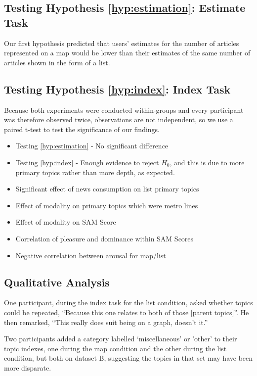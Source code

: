 \subsection{Testing Hypothesis \ref{hyp:estimation}: Estimate Task}

Our first hypothesis predicted that users' estimates for the number of articles represented on a map would be lower than their estimates of the same number of articles shown in the form of a list.


\subsection{Testing Hypothesis \ref{hyp:index}: Index Task}

Because both experiments were conducted within-groups and every participant was therefore observed twice, observations are not independent, so we use a paired t-test to test the significance of our findings.

\begin{itemize}
	\item Testing \ref{hyp:estimation} - No significant difference
	\item Testing \ref{hyp:index} - Enough evidence to reject $H_0$, and this is due to more primary topics rather than more depth, as expected.
	\item Significant effect of news consumption on list primary topics
	\item Effect of modality on primary topics which were metro lines
	\item Effect of modality on SAM Score
	\item Correlation of pleasure and dominance within SAM Scores
	\item Negative correlation between arousal for map/list
\end{itemize}

\subsection{Qualitative Analysis}

One participant, during the index task for the list condition, asked whether topics could be repeated, ``Because this one relates to both of those [parent topics]''. He then remarked, ``This really does suit being on a graph, doesn't it.''

Two participants added a category labelled `miscellaneous' or 'other' to their topic indexes, one during the map condition and the other during the list condition, but both on dataset B, suggesting the topics in that set may have been more disparate.


